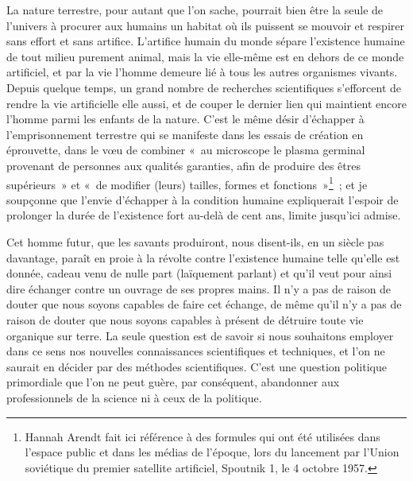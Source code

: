 {La nature terrestre, pour autant que l'on sache, pourrait bien être la
seule de l'univers à procurer aux humains un habitat où ils puissent
se mouvoir et respirer sans effort et sans artifice. L'artifice
humain du monde sépare l'existence humaine de tout milieu purement
animal, mais la vie elle-même est en dehors de ce monde artificiel,
et par la vie l'homme demeure lié à tous les autres organismes
vivants. Depuis quelque temps, un grand nombre de recherches
scientifiques s'efforcent de rendre la vie artificielle elle aussi,
et de couper le dernier lien qui maintient encore l'homme parmi les
enfants de la nature. C'est le même désir d'échapper à
l'emprisonnement terrestre qui se manifeste dans les essais de
création en éprouvette, dans le vœu de combiner «~au microscope le
plasma germinal provenant de personnes aux qualités garanties, afin
de produire des êtres supérieurs~» et «~de modifier (leurs) tailles,
formes et fonctions~»\footnote{Hannah Arendt fait ici référence à des formules qui ont été utilisées dans l'espace public et dans les médias de l'époque, lors du lancement par l'Union soviétique du premier satellite artificiel, Spoutnik 1, le 4 octobre 1957.}~; et je soupçonne que l'envie d'échapper à
la condition humaine expliquerait l'espoir de prolonger la durée de
l'existence fort au-delà de cent ans, limite jusqu'ici admise.

Cet homme futur, que les savants produiront, nous disent-ils, en un
siècle pas davantage, paraît en proie à la révolte contre l'existence
humaine telle qu'elle est donnée, cadeau venu de nulle part
(laïquement parlant) et qu'il veut pour ainsi dire échanger contre un
ouvrage de ses propres mains. Il n'y a pas de raison de douter que
nous soyons capables de faire cet échange, de même qu'il n'y a pas de
raison de douter que nous soyons capables à présent de détruire toute
vie organique sur terre. La seule question est de savoir si nous
souhaitons employer dans ce sens nos nouvelles connaissances
scientifiques et techniques, et l'on ne saurait en décider par des
méthodes scientifiques. C'est une question politique primordiale que
l'on ne peut guère, par conséquent, abandonner aux professionnels de
la science ni à ceux de la politique.
}


